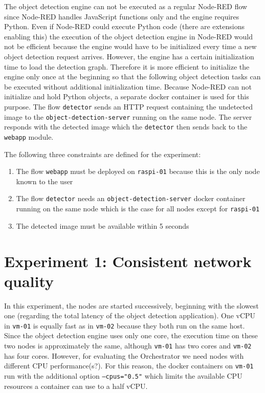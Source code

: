 The object detection engine can not be executed as a regular Node-RED flow since Node-RED handles JavaScript functions only and the engine requires Python. Even if Node-RED could execute Python code (there are extensions enabling this) the execution of the object detection engine in Node-RED would not be efficient because the engine would have to be initialized every time a new object detection request arrives. However, the engine has a certain initialization time to load the detection graph. Therefore it is more efficient to initialize the engine only once at the beginning so that the following object detection tasks can be executed without additional initialization time. Because Node-RED can not initialize and hold Python objects, a separate docker container is used for this purpose. The flow \texttt{detector} sends an HTTP request containing the undetected image to the \texttt{object-detection-server} running on the same node. The server responds with the detected image which the \texttt{detector} then sends back to the \texttt{webapp} module.

The following three constraints are defined for the experiment:
\begin{enumerate}
    \item The flow \texttt{webapp} must be deployed on \texttt{raspi-01} because this is the only node known to the user
    \item The flow \texttt{detector} needs an \texttt{object-detection-server} docker container running on the same node which is the case for all nodes except for \texttt{raspi-01}
    \item The detected image must be available within 5 seconds
\end{enumerate}

\section{Experiment 1: Consistent network quality\label{sec:eval-exp-1}}

In this experiment, the nodes are started successively, beginning with the slowest one (regarding the total latency of the object detection application). One vCPU in \texttt{vm-01} is equally fast as in \texttt{vm-02} because they both run on the same host. Since the object detection engine uses only one core, the execution time on these two nodes is approximately the same, although \texttt{vm-01} has two cores and \texttt{vm-02} has four cores. However, for evaluating the Orchestrator we need nodes with different CPU performance(s?). For this reason, the docker containers on \texttt{vm-01} run with the additional option \texttt{---cpus="0.5"} which limits the available CPU resources a container can use to a half vCPU.

